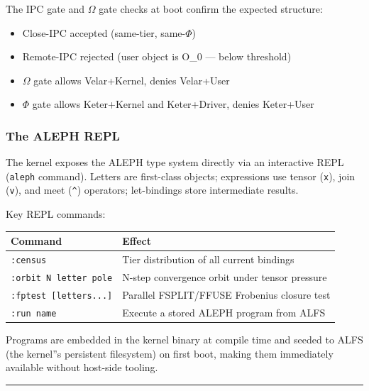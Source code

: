 \documentclass[12pt,a4paper]{article}
\begin{document}
The IPC gate and $\Omega$ gate checks at boot confirm the expected structure:

\begin{itemize}
    \item Close-IPC accepted (same-tier, same-$\Phi$)
    \item Remote-IPC rejected (user object is O\_0 --- below threshold)
    \item $\Omega$ gate allows Velar+Kernel, denies Velar+User
    \item $\Phi$ gate allows Keter+Kernel and Keter+Driver, denies Keter+User
\end{itemize}

\subsubsection{The ALEPH REPL}

The kernel exposes the ALEPH type system directly via an interactive REPL (\texttt{aleph} command). Letters are first-class objects; expressions use tensor (\texttt{x}), join (\texttt{v}), and meet (\texttt{\^{}}) operators; let-bindings store intermediate results.

Key REPL commands:

\begin{table}[htbp]
\centering
\small
{}
\begin{tabularx}{\textwidth}{>{\centering\arraybackslash}X >{\centering\arraybackslash}X}
\toprule
\rowcolor{gray!25}\textbf{Command} & \textbf{Effect} \\
\midrule
\rowcolors{1}{white}{gray!10}
\texttt{:census} & Tier distribution of all current bindings \\
\texttt{:orbit N letter pole} & N-step convergence orbit under tensor pressure \\
\texttt{:fptest {[}letters...{]}} & Parallel FSPLIT/FFUSE Frobenius closure test \\
\texttt{:run name} & Execute a stored ALEPH program from ALFS \\
\bottomrule
\end{tabularx}
\end{table}

Programs are embedded in the kernel binary at compile time and seeded to ALFS (the kernel''s persistent filesystem) on first boot, making them immediately available without host-side tooling.

\begin{center}
\rule{0.5\textwidth}{0.4pt}
\end{center}
\end{document}
